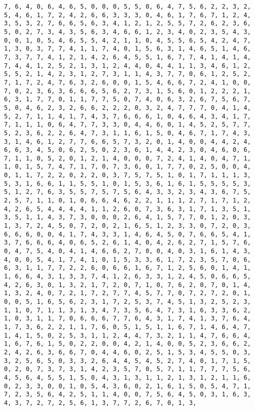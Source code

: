 \documentclass[11pt]{article}
\begin{document}
\begin{Verbatim}[commandchars=\\\{\}]
7, 6, 4, 0, 6, 4, 6, 5, 0, 0, 0, 5, 5, 0, 6, 4, 7, 5, 6, 2, 2, 3, 2, 5, 4, 6, 1, 7, 2, 4, 2, 6, 6, 3, 3, 3, 0, 4, 6, 1, 7, 6, 7, 1, 2, 4, 3, 5, 3, 2, 7, 6, 6, 5, 6, 3, 4, 1, 2, 1, 2, 5, 5, 7, 2, 6, 2, 3, 6, 5, 0, 2, 7, 3, 4, 3, 5, 6, 3, 4, 6, 6, 1, 2, 3, 4, 0, 2, 3, 5, 4, 3, 0, 0, 1, 0, 5, 4, 6, 5, 5, 4, 2, 1, 1, 0, 4, 5, 5, 6, 5, 4, 2, 4, 7, 1, 3, 0, 3, 7, 7, 4, 1, 1, 7, 4, 0, 1, 5, 6, 3, 1, 4, 6, 5, 1, 4, 6, 7, 3, 7, 7, 4, 1, 2, 1, 4, 2, 6, 4, 5, 5, 1, 6, 7, 7, 4, 1, 4, 1, 4, 7, 4, 4, 1, 2, 5, 2, 1, 3, 1, 2, 4, 4, 0, 4, 4, 1, 1, 3, 4, 6, 1, 2, 5, 5, 2, 1, 4, 2, 3, 1, 2, 7, 3, 1, 1, 4, 3, 7, 7, 0, 6, 1, 2, 5, 2, 7, 1, 7, 2, 4, 7, 6, 3, 2, 6, 0, 0, 1, 5, 4, 6, 6, 7, 2, 4, 1, 0, 0, 7, 0, 2, 3, 6, 3, 6, 6, 6, 5, 6, 2, 7, 3, 1, 5, 6, 0, 1, 2, 2, 2, 1, 6, 3, 1, 7, 7, 0, 1, 1, 7, 7, 5, 0, 7, 4, 0, 6, 3, 2, 6, 7, 5, 6, 7, 5, 0, 4, 6, 2, 3, 2, 6, 6, 2, 2, 2, 0, 3, 2, 4, 7, 7, 7, 0, 4, 1, 4, 5, 2, 7, 1, 1, 4, 1, 7, 4, 3, 7, 6, 6, 6, 1, 0, 4, 6, 4, 3, 4, 1, 7, 7, 1, 1, 1, 0, 6, 4, 7, 7, 3, 3, 0, 4, 4, 6, 0, 1, 4, 5, 2, 5, 7, 7, 5, 2, 3, 6, 2, 2, 6, 4, 7, 3, 1, 1, 6, 1, 5, 0, 4, 6, 7, 1, 7, 4, 3, 3, 1, 4, 6, 1, 2, 7, 7, 6, 6, 5, 7, 3, 2, 0, 1, 4, 0, 0, 4, 4, 2, 4, 6, 6, 3, 4, 5, 0, 6, 2, 5, 0, 2, 3, 6, 1, 4, 4, 2, 3, 0, 4, 6, 0, 6, 7, 1, 1, 0, 5, 2, 0, 1, 2, 1, 4, 0, 0, 0, 7, 2, 4, 1, 4, 0, 4, 7, 1, 1, 0, 1, 5, 7, 4, 7, 1, 7, 0, 7, 3, 6, 0, 1, 7, 7, 0, 2, 5, 0, 0, 4, 0, 1, 1, 7, 2, 2, 0, 2, 2, 0, 3, 7, 5, 7, 5, 1, 0, 1, 7, 1, 1, 1, 3, 5, 3, 1, 6, 6, 1, 1, 5, 5, 1, 0, 1, 5, 3, 6, 1, 6, 1, 5, 5, 5, 5, 3, 5, 1, 2, 7, 6, 3, 5, 5, 7, 5, 7, 5, 6, 4, 3, 3, 2, 3, 4, 3, 6, 7, 5, 2, 5, 7, 1, 1, 0, 1, 0, 6, 6, 4, 6, 2, 2, 1, 1, 1, 2, 7, 1, 7, 1, 2, 4, 2, 6, 5, 4, 4, 4, 4, 1, 1, 2, 6, 0, 7, 3, 6, 3, 1, 7, 1, 3, 5, 1, 3, 5, 1, 1, 4, 3, 7, 3, 0, 0, 0, 2, 6, 4, 1, 5, 7, 7, 0, 1, 2, 0, 3, 1, 3, 7, 2, 4, 5, 0, 7, 2, 0, 2, 1, 6, 5, 1, 2, 3, 3, 0, 7, 2, 0, 3, 6, 6, 6, 0, 0, 4, 1, 7, 4, 3, 3, 1, 4, 6, 4, 5, 0, 7, 6, 6, 5, 4, 1, 3, 7, 6, 6, 6, 4, 0, 6, 5, 2, 6, 1, 4, 0, 4, 2, 6, 2, 7, 1, 5, 7, 6, 0, 4, 7, 5, 4, 0, 4, 1, 4, 6, 6, 2, 7, 0, 0, 4, 0, 3, 1, 6, 1, 4, 3, 4, 0, 0, 5, 4, 1, 7, 4, 1, 0, 1, 5, 3, 3, 6, 1, 7, 2, 3, 5, 7, 0, 6, 6, 3, 1, 1, 7, 7, 2, 2, 6, 0, 6, 6, 1, 6, 7, 1, 2, 5, 6, 0, 1, 4, 1, 1, 6, 6, 4, 3, 1, 3, 3, 7, 4, 1, 2, 6, 3, 3, 1, 2, 4, 5, 0, 6, 6, 5, 4, 2, 6, 3, 0, 1, 3, 2, 1, 7, 2, 0, 7, 1, 0, 7, 6, 2, 0, 7, 0, 1, 4, 1, 3, 2, 4, 0, 7, 2, 1, 7, 2, 7, 7, 4, 5, 7, 7, 0, 7, 2, 7, 2, 0, 1, 0, 0, 5, 1, 6, 5, 6, 2, 3, 1, 7, 2, 5, 3, 7, 4, 5, 1, 3, 2, 5, 2, 3, 1, 1, 0, 7, 1, 1, 3, 1, 3, 4, 7, 3, 5, 6, 4, 7, 3, 1, 6, 3, 3, 6, 2, 1, 0, 3, 1, 1, 7, 0, 6, 6, 6, 7, 7, 6, 4, 3, 1, 7, 4, 1, 3, 7, 6, 4, 1, 7, 3, 6, 2, 2, 1, 1, 7, 6, 0, 5, 1, 5, 1, 1, 6, 7, 1, 4, 6, 4, 7, 1, 4, 1, 5, 0, 2, 5, 3, 1, 1, 2, 4, 4, 7, 3, 2, 1, 1, 4, 7, 6, 6, 4, 1, 6, 7, 6, 1, 5, 0, 2, 2, 0, 0, 4, 2, 1, 4, 0, 0, 5, 2, 3, 6, 6, 2, 2, 4, 2, 6, 3, 6, 6, 7, 0, 4, 4, 6, 0, 2, 5, 1, 5, 3, 4, 5, 5, 0, 3, 3, 2, 5, 6, 5, 0, 3, 3, 2, 6, 4, 4, 5, 4, 5, 2, 7, 4, 0, 1, 7, 1, 5, 0, 2, 0, 7, 3, 7, 3, 1, 4, 2, 3, 5, 7, 0, 5, 7, 1, 1, 7, 7, 7, 5, 6, 4, 5, 6, 4, 5, 5, 1, 5, 0, 4, 3, 1, 3, 1, 1, 2, 1, 3, 1, 2, 1, 1, 6, 0, 2, 3, 3, 0, 0, 1, 0, 5, 4, 3, 6, 0, 2, 1, 6, 1, 5, 0, 5, 4, 7, 1, 7, 2, 3, 5, 6, 4, 2, 5, 1, 1, 4, 0, 0, 7, 5, 6, 4, 5, 0, 3, 1, 6, 3, 4, 3, 7, 2, 7, 2, 5, 6, 1, 3, 7, 7, 2, 6, 7, 0, 1, 3, 
\end{Verbatim}
\end{document}
